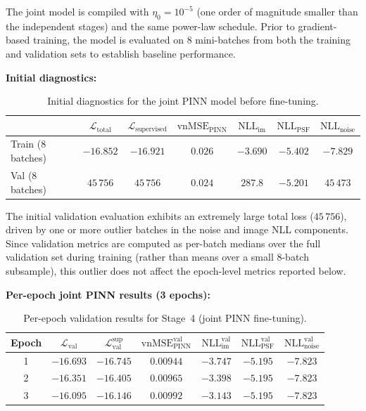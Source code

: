 \documentclass{aa}
\begin{document}
The joint model is compiled with $\eta_0 = 10^{-5}$ (one order of magnitude smaller than the independent stages) and the same power-law schedule. Prior to gradient-based training, the model is evaluated on 8 mini-batches from both the training and validation sets to establish baseline performance.

\textbf{Initial diagnostics:}

\begin{table}[h]
\centering
\begin{tabular}{|l|c|c|c|c|c|c|}
\hline
 & $\mathcal{L}_\mathrm{total}$ & $\mathcal{L}_\mathrm{supervised}$ & $\mathrm{vnMSE}_\mathrm{PINN}$ & $\mathrm{NLL}_\mathrm{im}$ & $\mathrm{NLL}_\mathrm{PSF}$ & $\mathrm{NLL}_\mathrm{noise}$ \\
\hline
Train (8 batches) & $-16.852$ & $-16.921$ & $0.026$ & $-3.690$ & $-5.402$ & $-7.829$ \\
Val (8 batches) & $45\,756$ & $45\,756$ & $0.024$ & $287.8$ & $-5.201$ & $45\,473$ \\
\hline
\end{tabular}
\caption{Initial diagnostics for the joint PINN model before fine-tuning.}
\label{tab:step4_init}
\end{table}

The initial validation evaluation exhibits an extremely large total loss ($45\,756$), driven by one or more outlier batches in the noise and image NLL components. Since validation metrics are computed as per-batch medians over the full validation set during training (rather than means over a small 8-batch subsample), this outlier does not affect the epoch-level metrics reported below.

\textbf{Per-epoch joint PINN results (3 epochs):}

\begin{table}[h]
\centering
\begin{tabular}{|c|c|c|c|c|c|c|}
\hline
\textbf{Epoch} & $\mathcal{L}_\mathrm{val}$ & $\mathcal{L}_\mathrm{val}^\mathrm{sup}$ & $\mathrm{vnMSE}_\mathrm{PINN}^\mathrm{val}$ & $\mathrm{NLL}_\mathrm{im}^\mathrm{val}$ & $\mathrm{NLL}_\mathrm{PSF}^\mathrm{val}$ & $\mathrm{NLL}_\mathrm{noise}^\mathrm{val}$ \\
\hline
1 & $-16.693$ & $-16.745$ & $0.00944$ & $-3.747$ & $-5.195$ & $-7.823$ \\
2 & $-16.351$ & $-16.405$ & $0.00965$ & $-3.398$ & $-5.195$ & $-7.823$ \\
3 & $-16.095$ & $-16.146$ & $0.00992$ & $-3.143$ & $-5.195$ & $-7.823$ \\
\hline
\end{tabular}
\caption{Per-epoch validation results for Stage~4 (joint PINN fine-tuning).}
\label{tab:step4}
\end{table}
\end{document}
